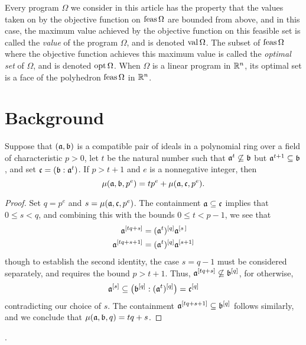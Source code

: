 \documentclass{amsart}
\begin{document}
Every program $\Omega$ we consider in this article has the property that the values taken on by the objective function on $\operatorname{feas} \Omega$ are bounded from above, and in this case, the maximum value achieved by the objective function on this feasible set is called the \emph{value} of the program $\Omega$, and is denoted $\operatorname{val} \Omega$.  The subset of $\operatorname{feas} \Omega$ where the objective function achieves this maximum value is called the \emph{optimal set} of $\Omega$, and is denoted $\operatorname{opt} \Omega$.   When $\Omega$ is a linear program in $\mathbb{R}^n$, its optimal set is a face of the polyhedron $\operatorname{feas} \Omega$ in $\mathbb{R}^n$.

\section{Background}
\label{background: S}

\begin{lemma} 
\label{compatible to small compatible: L}
 Suppose that $(\mathfrak{a}, \mathfrak{b})$ is a compatible pair of ideals in a polynomial ring over a field of characteristic $p>0$, let $t$ be the natural number such that $\mathfrak{a}^t \not \subseteq \mathfrak{b}$ but $\mathfrak{a}^{t+1} \subseteq \mathfrak{b}$, and set $\mathfrak{c} = (\mathfrak{b} : \mathfrak{a}^t)$.   If $p > t+1$ and $e$ is a nonnegative integer, then
\[ \mu(\mathfrak{a}, \mathfrak{b}, p^e) = t p^e + \mu(\mathfrak{a}, \mathfrak{c}, p^e). \] 
\end{lemma}

\begin{proof}  Set $q=p^e$ and $s=\mu(\mathfrak{a}, \mathfrak{c}, p^e)$.  The containment $\mathfrak{a} \subseteq \mathfrak{c}$ implies that $0 \leq s < q$, and combining this with the bounds $0 \le t < p-1$, we see that 
%
\begin{align*}
\mathfrak{a}^{[tq+s]} & = (\mathfrak{a}^t)^{[q]} \mathfrak{a}^{[s \, ]} \\ 
 \mathfrak{a}^{[tq+s+1]} & = (\mathfrak{a}^t)^{[q]} \mathfrak{a}^{[s+1]}
\end{align*}
%
though to establish the second identity, the case $s=q-1$ must be considered separately, and requires the bound $p>t+1$.  Thus, $\mathfrak{a}^{[tq+s]} \not \subseteq \mathfrak{b}^{[q]}$, for otherwise, \[ \mathfrak{a}^{[s]} \subseteq \big(\mathfrak{b}^{[q]} : (\mathfrak{a}^t)^{[q]}\big) = \mathfrak{c}^{[q]}\]  contradicting our choice of $s$.  The containment $\mathfrak{a}^{[tq+s+1]} \subseteq \mathfrak{b}^{[q]}$ follows similarly, and we conclude that $\mu(\mathfrak{a},\mathfrak{b},q) = tq + s$. 
\end{proof}.
\end{document}
